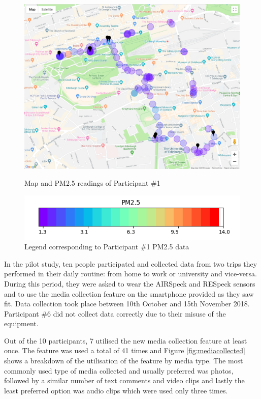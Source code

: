 \begin{figure}[H] 
\centering
\includegraphics[width=\linewidth]{images/map_PHP001} 
\caption{Map and PM2.5 readings of Participant \#1}
\label{fig:map}
\vspace{0.5cm}
\includegraphics[width=.8\linewidth]{images/legend_PHP001} 
\caption{Legend corresponding to Participant \#1 PM2.5 data} 
\label{fig:scale}
\end{figure}


In the pilot study, ten people participated and collected data from two trips they performed in their daily routine: from home to work or university and vice-versa. During this period, they were asked to wear the AIRSpeck and RESpeck sensors and to use the media collection feature on the smartphone provided as they saw fit. Data collection took place between 10th October and 15th November 2018. Participant \#6 did not collect data correctly due to their misuse of the equipment.


Out of the 10 participants, 7 utilised the new media collection feature at least once. The feature was used a total of 41 times and Figure \ref{fig:mediacollected} shows a breakdown of the utilisation of the feature by media type. The most commonly used type of media collected and usually preferred was photos, followed by a similar number of text comments and video clips and lastly the least preferred option was audio clips which were used only three times.

